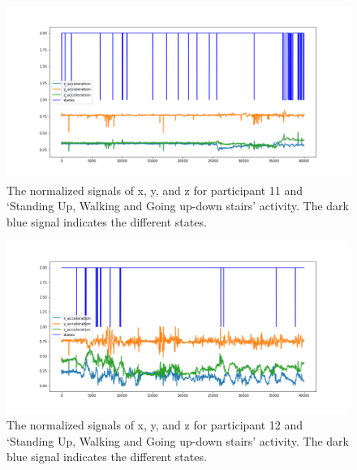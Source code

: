 \begin{figure}[H]
    \centering
    \begin{minipage}[b]{1\textwidth}
        \includegraphics[width=\textwidth]{manuscript/src/figures/Ass3/Ass3_Q2_states_user_10N.png}
    \end{minipage}
    \caption{The normalized signals of x, y, and z for participant 11 and ‘Standing  Up,  Walking  and  Going  up-down  stairs’ activity. The dark blue signal indicates the different states.}
    \label{fig:Ass3_Q2_states_user_10N}
\end{figure}
\begin{figure}[H]
    \centering
    \begin{minipage}[b]{1\textwidth}
        \includegraphics[width=\textwidth]{manuscript/src/figures/Ass3/Ass3_Q2_states_user_11N.png}
    \end{minipage}
    \caption{The normalized signals of x, y, and z for participant 12 and ‘Standing  Up,  Walking  and  Going  up-down  stairs’ activity. The dark blue signal indicates the different states.}
    \label{fig:Ass3_Q2_states_user_11N}
\end{figure}
